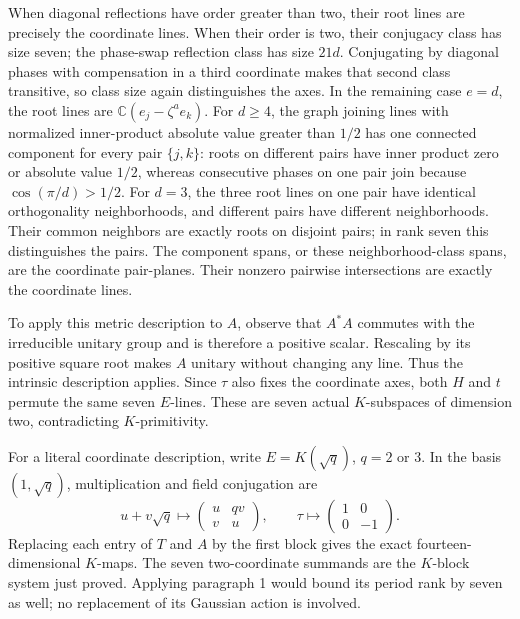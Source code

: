 When diagonal reflections have order greater than two, their root
lines are precisely the coordinate lines. When their order is
two, their conjugacy class has size seven; the phase-swap
reflection class has size \(21d\). Conjugating by diagonal
phases with compensation in a third coordinate makes that second
class transitive, so class size again distinguishes the axes.
In the remaining case \(e=d\), the root lines are
\(\mathbb C(e_j-\zeta^a e_k)\).
For \(d\ge4\), the graph joining lines with normalized
inner-product absolute value greater than \(1/2\) has one
connected component for every pair \(\{j,k\}\): roots on
different pairs have inner product zero or absolute value
\(1/2\), whereas consecutive phases on one pair join because
\(\cos(\pi/d)>1/2\).
For \(d=3\), the three root lines on one pair have identical
orthogonality neighborhoods, and different pairs have different
neighborhoods. Their common neighbors are exactly roots on
disjoint pairs; in rank seven this distinguishes the pairs.
The component spans, or these neighborhood-class spans, are the
coordinate pair-planes. Their nonzero pairwise intersections are
exactly the coordinate lines.

To apply this metric description to \(A\), observe that
\(A^*A\) commutes with the irreducible unitary group and is
therefore a positive scalar. Rescaling by its positive square
root makes \(A\) unitary without changing any line. Thus the
intrinsic description applies. Since \(\tau\) also fixes the
coordinate axes, both \(H\) and \(t\) permute the same seven
\(E\)-lines. These are seven actual \(K\)-subspaces of
dimension two, contradicting \(K\)-primitivity.

For a literal coordinate description, write
\(E=K(\sqrt q)\), \(q=2\) or \(3\). In the basis
\((1,\sqrt q)\), multiplication and field conjugation are
\[
 u+v\sqrt q\longmapsto
 \begin{pmatrix}u&qv\\v&u\end{pmatrix},\qquad
 \tau\longmapsto\begin{pmatrix}1&0\\0&-1\end{pmatrix}.
                                                               \tag{S38.12}
\]
Replacing each entry of \(T\) and \(A\) by the first block
gives the exact fourteen-dimensional \(K\)-maps. The seven
two-coordinate summands are the \(K\)-block system just
proved. Applying paragraph 1 would bound its period rank by
seven as well; no replacement of its Gaussian action is involved.


